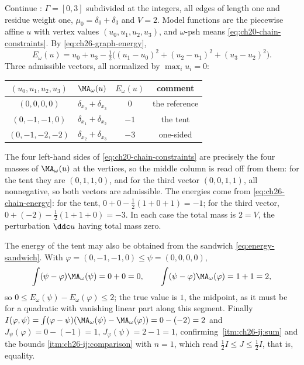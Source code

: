 \begin{example}
\label{ex:ch26-chain-energy}
Continue : \(\Gamma=[0,3]\) subdivided at the
integers, all edges of length one and residue weight one,
\(\mu_0=\delta_0+\delta_3\) and \(V=2\).
Model functions are the piecewise affine \(u\) with vertex values
\((u_0,u_1,u_2,u_3)\), and \(\omega\)-psh means
\eqref{eq:ch20-chain-constraints}.  By \eqref{eq:ch26-graph-energy},
\begin{equation}
\label{eq:ch26-chain-energy}
 E_\omega(u)=u_0+u_3
   -\tfrac12\bigl((u_1-u_0)^2+(u_2-u_1)^2+(u_3-u_2)^2\bigr).
\end{equation}
Three admissible vectors, all normalized by \(\max_iu_i=0\):
\begin{center}
\small
\begin{tabular}{c|c|c|c}
\toprule
\((u_0,u_1,u_2,u_3)\)&\(\MA_\omega(u)\)&\(E_\omega(u)\)&comment\\
\midrule
\((0,0,0,0)\)&\(\delta_{x_0}+\delta_{x_3}\)&\(0\)&the reference\\
\((0,-1,-1,0)\)&\(\delta_{x_1}+\delta_{x_2}\)&\(-1\)&the tent\\
\((0,-1,-2,-2)\)&\(\delta_{x_2}+\delta_{x_3}\)&\(-3\)&one-sided\\
\bottomrule
\end{tabular}
\end{center}
The four left-hand sides of \eqref{eq:ch20-chain-constraints} are precisely
the four masses of \(\MA_\omega(u)\) at the vertices, so the middle column is
read off from them: for the tent they are \((0,1,1,0)\), and for the third
vector \((0,0,1,1)\), all nonnegative, so both vectors are admissible.  The
energies come from \eqref{eq:ch26-chain-energy}: for the tent,
\(0+0-\tfrac12(1+0+1)=-1\); for the third vector,
\(0+(-2)-\tfrac12(1+1+0)=-3\).  In each case the total mass is \(2=V\), the
perturbation \(\ddc u\) having total mass zero.

The energy of the tent may also be obtained from the sandwich
\eqref{eq:energy-sandwich}.  With \(\varphi=(0,-1,-1,0)\leq\psi=(0,0,0,0)\),
\[
 \int(\psi-\varphi)\MA_\omega(\psi)=0+0=0,
 \qquad
 \int(\psi-\varphi)\MA_\omega(\varphi)=1+1=2 ,
\]
so \(0\leq E_\omega(\psi)-E_\omega(\varphi)\leq2\); the true value is \(1\),
the midpoint, as it must be for a quadratic with vanishing linear part along
this segment.  Finally
\(I(\varphi,\psi)=\int(\varphi-\psi)(\MA_\omega(\psi)-\MA_\omega(\varphi))
=0-(-2)=2\) and
\(J_\psi(\varphi)=0-(-1)=1\), \(J_\varphi(\psi)=2-1=1\), confirming
\,\cref{itm:ch26-ij:sum} and the
bounds \cref{itm:ch26-ij:comparison} with \(n=1\), which read
\(\tfrac12I\leq J\leq\tfrac12I\), that is, equality.
\end{example}

